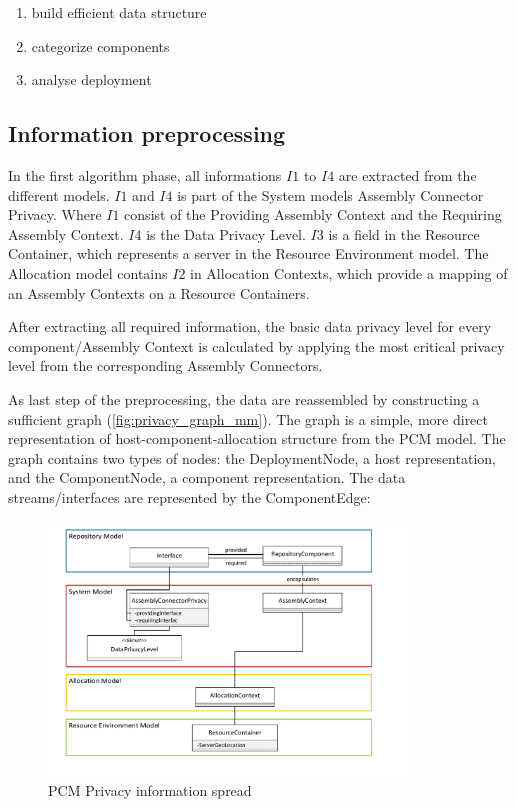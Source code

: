 \begin{enumerate}
	\label{enum:algorithm_steps}
	\setlength\itemsep{0em}
	\item build efficient data structure
	\item categorize components
	\item analyse deployment
\end{enumerate}


\subsection{Information preprocessing}
\label{sec:PrivacyAnalysis:implementation:prepro}

In the first algorithm phase, all informations $I1$ to $I4$ are extracted from the different models. $I1$ and $I4$ is part of the System models Assembly Connector Privacy. Where $I1$ consist of the Providing Assembly Context and the Requiring Assembly Context. $I4$ is the Data Privacy Level. $I3$ is a field in the Resource Container, which represents a server in the Resource Environment model. The Allocation model contains $I2$ in Allocation Contexts, which provide a mapping of an Assembly Contexts on a Resource Containers.

After extracting all required information, the basic data privacy level for every component/Assembly Context is calculated by applying the most critical privacy level from the corresponding Assembly Connectors.

As last step of the preprocessing, the data are reassembled by constructing a sufficient graph (\autoref{fig:privacy_graph_mm}). The graph is a simple, more direct representation of host-component-allocation structure from the PCM model. The graph contains two types of nodes: the DeploymentNode, a host representation, and the ComponentNode, a component representation. The data streams/interfaces are represented by the ComponentEdge:

\begin{figure}[h]
	\centering
	\includegraphics[trim = 10mm 10mm 25mm 5mm, clip, width=0.85\textwidth]{graphs/PCM_Info_spread}
	\caption{PCM Privacy information spread}
	\label{fig:pcm_info_spread}
\end{figure}

